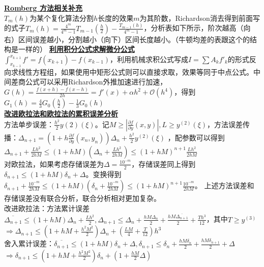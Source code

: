 \documentclass[UTF8,a4paper,landscape,8pt]{paper}
\renewcommand{\subsection}[1]{{\small\textbf{\underline{#1}}}\\ }
\begin{document}
\begin{multicols}{4}
    \subsection{Romberg 方法相关补充}
    $T_m(h)$为某个复化算法分割$h$长度的效果$m$为其阶数，Richardson消去得到前面写的式子$T_m(h) = \frac{4^m}{4^m-1}T_{m-1}(\frac h2) - \frac {T_{m-1}(h)}{4^m-1}$，分析表如下所示，阶次越高（向右）区间误差越小，分割越小（向下）区间长度越小。（牛顿均差的表跟这个的结构是一样的）
    \subsection{利用积分公式求解微分公式}
    $\int_{x_{k-1}}^{x_{k+1}}f' = f(x_{k+1}) - f(x_{k-1})$，利用机械求积公式写成$I = \sum A_kf'_k$的形式反向求线性方程组，如果使用中矩形公式则可以直接求取，效果等同于中点公式。中间差商公式可以采用Richardson外推加速进行加速，$G(h) = \frac{f(x+h) - f(x-h)}{2h} = f'(x) + \alpha h^2 + \mathcal O(h^4)$，得到$G_1(h) = \frac43G_0(\frac h2) -\frac13G_0(h)$\\
    \subsection{改进欧拉法和欧拉法的累积误差分析}
    方法单步误差：$\frac {h^2}2y{(2)}(\xi)$。记$M \ge |\frac{\partial f}{\partial y}(x,y)|,L \ge y^{(2)}(\xi)$，方法误差传播：$\Delta_{n+1} = (1 + h\frac{\partial f}{\partial y}(x_n,y_n))\Delta_n + \frac {h^2}2y^{(2)}(\xi)$ ，配参数可以得到$\Delta_{n+1} + \frac {Lh^2}{2hM} \le (1 + hM)(\Delta_{n} + \frac {Lh^2}{2hM}) \le (1 + hM)^{n+1}\frac {Lh^2}{2hM}$\\
    对欧拉法，如果考虑存储误差为$\Delta = \frac{10^{-m}}2$，存储误差同上得到$\delta_{n+1}\le (1+hM)\delta_n + \Delta$。变换得到$\delta_{n+1} + \frac{10^{-m}}{2hM} \le (1 +hM)(\delta_n+\frac{10^{-m}}{2hM}) \le (1 + hM)^{n+1}\frac{10^{-m}}{2hM}$。
    上述方法误差和存储误差没有联合分析，联合分析相对更加复杂。\\
    改进欧拉法：方法累计误差$\overline{\Delta_{n+1}} \le (1+hM)\Delta_n + \frac{Lh^2}2,\Delta_{n+1} \le \Delta_n + \frac{hM\Delta_n}2 + \frac {hM\overline{\Delta_{n+1}}}2 + \frac{Th^3}{12}$，其中$T \ge y^{(3)}$\\
    $\Rightarrow \Delta_{n+1} \le (1 + hM + \frac{h^2M^2}2)\Delta_n + (\frac{LM}4+\frac T{12})h^3$\\
    舍入累计误差：$\overline{\delta_{n+1}} \le (1 + hM)\delta_n + \Delta,\delta_{n+1} \le \delta_n + \frac {hM\delta_n}2 + \frac{hM\delta_{n+1}}2 + \Delta$\\
    $\Rightarrow \delta_{n+1} \le (1 + hM + \frac{h^2M^2}2)\delta_n + (1 +\frac{hM}2\Delta)$\\

\end{multicols}
\end{document}
